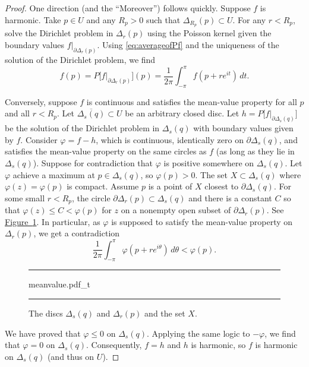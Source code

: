 \documentclass[12pt,openany]{book}
\newcommand{\myquote}[1]{``#1''}
\theoremstyle{plain}
\theoremstyle{remark}
\theoremstyle{definition}
\newenvironment{myfig}{%
\begin{figure}[h!t]
\noindent\rule{\textwidth}{0.5pt}\vspace{12pt}\par\centering}%
{\par\noindent\rule{\textwidth}{0.5pt}
\end{figure}}
\theoremstyle{exercise}
\theoremstyle{example}
\newcommand{\figureref}[1]{\hyperref[#1]{Figure~\ref*{#1}}}
\begin{document}
\begin{proof}
One direction (and the \myquote{Moreover}) follows quickly.
Suppose $f$ is harmonic.
Take $p \in U$ and
any $R_p > 0$ such that $\Delta_{R_p}(p) \subset U$.
For any $r < R_p$,
solve the Dirichlet problem in $\Delta_r(p)$ using the Poisson kernel
given the boundary values
$f|_{\partial \Delta_r(p)}$.  Using \eqref{eq:averageofPf} and the
uniqueness of the solution of the Dirichlet problem, we find
\begin{equation*}
f(p) = P\bigl[f|_{\partial \Delta_r(p)}\bigr](p) =
\frac{1}{2\pi} \int_{-\pi}^{\pi}f(p + r e^{it}) \, dt .
\end{equation*}

Conversely, suppose $f$ is continuous and satisfies the
mean-value property for all $p$ and all $r < R_p$.
Let $\overline{\Delta_s(q)} \subset U$ be an
arbitrary closed disc.  Let $h = P\bigl[f|_{\partial \Delta_s(q)}\bigr]$
be the solution of the Dirichlet problem in $\Delta_s(q)$ with boundary
values given by $f$.  Consider $\varphi = f-h$,
which is continuous, identically zero
on $\partial \Delta_s(q)$, and satisfies the mean-value property
on the same circles as $f$ (as long as they lie in $\Delta_s(q)$).
Suppose for contradiction that $\varphi$ is positive
somewhere on $\Delta_s(q)$.
Let $\varphi$ achieve a maximum at $p \in
\Delta_s(q)$, so $\varphi(p) > 0$.
The set $X \subset \Delta_s(q)$ where $\varphi(z) = \varphi(p)$ is compact.
Assume $p$ is a point of $X$ closest to
$\partial \Delta_s(q)$.  For some small $r < R_p$, the circle
$\partial \Delta_r(p) \subset \Delta_s(q)$ and there is a constant
$C$ so that $\varphi(z) \leq C < \varphi(p)$ for $z$
on a nonempty open subset
of $\partial \Delta_r(p)$.  See \figureref{fig:meanvalue}.
In particular, as 
$\varphi$ is supposed to satisfy the
mean-value property on $\Delta_r(p)$, we get a contradiction
\begin{equation*}
\frac{1}{2\pi} \int_{-\pi}^{\pi} \varphi(p+re^{i\theta})\, d\theta <
\varphi(p) .
\end{equation*}

\begin{myfig}
{meanvalue.pdf_t}
\caption{The discs $\Delta_s(q)$ and $\Delta_r(p)$ and the set
$X$.\label{fig:meanvalue}}
\end{myfig}

We have proved that $\varphi \leq 0$ on $\Delta_s(q)$.  Applying the same
logic to $-\varphi$, we find that $\varphi = 0$ on $\Delta_s(q)$.
Consequently, $f=h$ and $h$ is harmonic, so $f$ is harmonic on
$\Delta_s(q)$ (and thus on $U$).
\end{proof}
\end{document}
